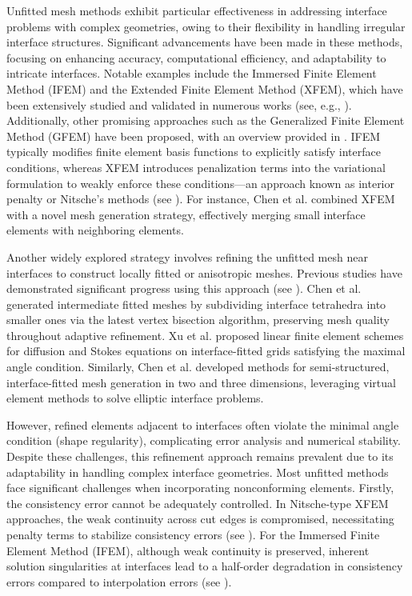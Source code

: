 \documentclass[a4paper,11pt,fleqn]{article}
\numberwithin{equation}{section}
\begin{document}
Unfitted mesh methods exhibit particular effectiveness in addressing interface problems with complex geometries, owing to their flexibility in handling irregular interface structures. Significant advancements have been made in these methods, focusing on enhancing accuracy, computational efficiency, and adaptability to intricate interfaces. Notable examples include the Immersed Finite Element Method (IFEM) and the Extended Finite Element Method (XFEM), which have been extensively studied and validated in numerous works (see, e.g., \cite{Li1998, Li2003, An2014, Chou2012immersed, Lin2015, Ji2023, Wang2019a, Zhang2019strongly}). Additionally, other promising approaches such as the Generalized Finite Element Method (GFEM) have been proposed, with an overview provided in \cite{Fries2010extended}. IFEM typically modifies finite element basis functions to explicitly satisfy interface conditions, whereas XFEM introduces penalization terms into the variational formulation to weakly enforce these conditions—an approach known as interior penalty or Nitsche's methods (see \cite{Hansbo2002unfitted, Li2003, burman2015cutfem, Hansbo2014cut, Cao2022extended, Fries2010extended}). For instance, Chen et al. \cite{Chen2023an} combined XFEM with a novel mesh generation strategy, effectively merging small interface elements with neighboring elements.

Another widely explored strategy involves refining the unfitted mesh near interfaces to construct locally fitted or anisotropic meshes. Previous studies have demonstrated significant progress using this approach (see \cite{Chen2009the, Xu2016optimal, chen2017interface, Hu2021optimal}). Chen et al. \cite{Chen2009the} generated intermediate fitted meshes by subdividing interface tetrahedra into smaller ones via the latest vertex bisection algorithm, preserving mesh quality throughout adaptive refinement. Xu et al. \cite{Xu2016optimal} proposed linear finite element schemes for diffusion and Stokes equations on interface-fitted grids satisfying the maximal angle condition. Similarly, Chen et al. \cite{chen2017interface} developed methods for semi-structured, interface-fitted mesh generation in two and three dimensions, leveraging virtual element methods to solve elliptic interface problems.

However, refined elements adjacent to interfaces often violate the minimal angle condition (shape regularity), complicating error analysis and numerical stability. Despite these challenges, this refinement approach remains prevalent due to its adaptability in handling complex interface geometries.
Most unfitted methods face significant challenges when incorporating nonconforming elements. Firstly, the consistency error cannot be adequately controlled. In Nitsche-type XFEM approaches, the weak continuity across cut edges is compromised, necessitating penalty terms to stabilize consistency errors (see \cite{Wang2019a}). For the Immersed Finite Element Method (IFEM), although weak continuity is preserved, inherent solution singularities at interfaces lead to a half-order degradation in consistency errors compared to interpolation errors (see \cite{Ji2023analysis}).
\end{document}

